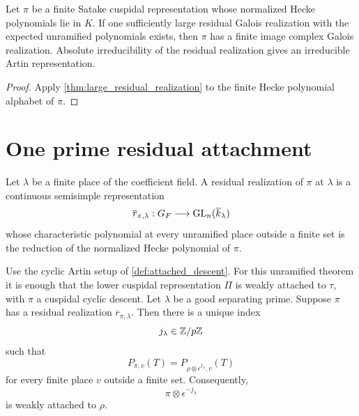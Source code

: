 \begin{corollary}\label{cor:large_residual_finite_satake}
Let \(\pi\) be a finite Satake cuspidal representation whose normalized Hecke polynomials lie in \(K\). If one sufficiently large residual Galois realization with the expected unramified polynomials exists, then \(\pi\) has a finite image complex Galois realization. Absolute irreducibility of the residual realization gives an irreducible Artin representation.
\end{corollary}

\begin{proof}
Apply \cref{thm:large_residual_realization} to the finite Hecke polynomial alphabet of \(\pi\).
\end{proof}

\section{One prime residual attachment}\label{sec:one_prime_attachment}

\begin{definition}\label{def:residual_realization}
Let \(\lambda\) be a finite place of the coefficient field. A residual realization of \(\pi\) at \(\lambda\) is a continuous semisimple representation
\[
\overline r_{\pi,\lambda}:G_F\longrightarrow\operatorname{GL}_n(\overline k_{\lambda})
\]
whose characteristic polynomial at every unramified place outside a finite set is the reduction of the normalized Hecke polynomial of \(\pi\).
\end{definition}

\begin{theorem}\label{thm:one_prime_attachment}
Use the cyclic Artin setup of \cref{def:attached_descent}. For this unramified theorem it is enough that the lower cuspidal representation \(\Pi\) is weakly attached to \(\tau\), with \(\pi\) a cuspidal cyclic descent. Let \(\lambda\) be a good separating prime. Suppose \(\pi\) has a residual realization \(\overline r_{\pi,\lambda}\). Then there is a unique index
\[
j_{\lambda}\in\mathbb Z/p\mathbb Z
\]
such that
\[
\boxed{
P_{\pi,v}(T)
=
P_{\rho\otimes\epsilon^{j_{\lambda}},v}(T)
}
\]
for every finite place \(v\) outside a finite set. Consequently,
\[
\pi\otimes\epsilon^{-j_{\lambda}}
\]
is weakly attached to \(\rho\).
\end{theorem}

